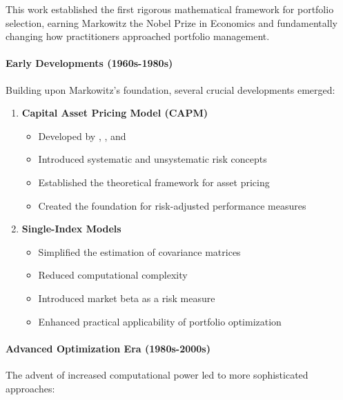 This work established the first rigorous mathematical framework for portfolio selection, earning Markowitz the Nobel Prize in Economics and fundamentally changing how practitioners approached portfolio management.

\paragraph{Early Developments (1960s-1980s)}
Building upon Markowitz's foundation, several crucial developments emerged:

\begin{enumerate}
    \item \textbf{Capital Asset Pricing Model (CAPM)}
    \begin{itemize}
        \item Developed by \parencite{sharpe1964capital}, \parencite{lintner1965security}, and \parencite{mossin1966equilibrium}
        \item Introduced systematic and unsystematic risk concepts
        \item Established the theoretical framework for asset pricing
        \item Created the foundation for risk-adjusted performance measures
    \end{itemize}

    \item \textbf{Single-Index Models}
    \begin{itemize}
        \item Simplified the estimation of covariance matrices
        \item Reduced computational complexity
        \item Introduced market beta as a risk measure
        \item Enhanced practical applicability of portfolio optimization
    \end{itemize}
\end{enumerate}

\paragraph{Advanced Optimization Era (1980s-2000s)}
The advent of increased computational power led to more sophisticated approaches:

